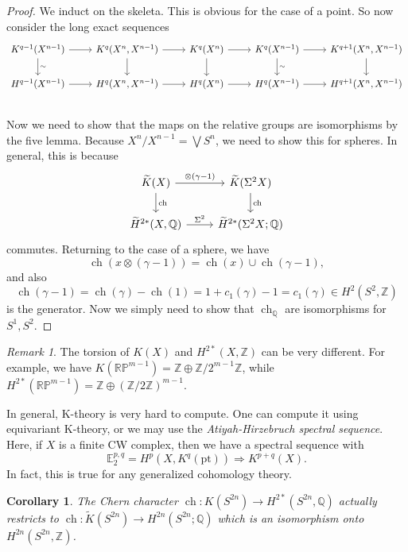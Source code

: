 \documentclass[leqno, openany]{memoir}
\newtheorem{cor}[thm]{Corollary}
\theoremstyle{definition}
\theoremstyle{remark}
\newtheorem{rmk}[thm]{Remark}
\theoremstyle{plain}
\theoremstyle{definition}
\theoremstyle{remark}
\newcommand{\R}{\mathbb{R}}
\newcommand{\E}{\mathbb{E}}
\newcommand{\Z}{\mathbb{Z}}
\newcommand{\Q}{\mathbb{Q}}
\renewcommand{\P}{\mathbb{P}}
\newcommand{\mr}[1]{\mathrm{#1}}
\newcommand{\wt}[1]{\widetilde{#1}}
\DeclareMathOperator{\ch}{ch}
\begin{document}
\begin{proof}
    We induct on the skeleta. This is obvious for the case of a point. So now consider the long exact sequences
    \begin{equation*}
    \begin{tikzcd}
        K^{q-1}(X^{n-1}) \ar{r} \ar{d}{\sim} & K^q(X^n, X^{n-1}) \ar{d} \ar{r} & K^q(X^n) \ar{d} \ar{r} & K^q(X^{n-1}) \ar{d}{\sim}\ar{r} & K^{q+1}(X^n, X^{n-1}) \ar{d} \\
        H^{q-1}(X^{n-1}) \ar{r} & H^q(X^n, X^{n-1}) \ar{r} & H^q(X^n) \ar{r} & H^q(X^{n-1}) \ar{r} & H^{q+1}(X^n, X^{n-1}) \\
    \end{tikzcd}
    \end{equation*}
    Now we need to show that the maps on the relative groups are isomorphisms by the five lemma. Because $X^n/X^{n-1} = \bigvee S^n$, we need to show this for spheres. In general, this is because
    \begin{equation*}
    \begin{tikzcd}
        \wt{K}(X) \ar{r}{\otimes(\gamma-1)} \ar{d}{\ch} & \wt{K}(\Sigma^2 X) \ar{d}{\ch} \\
        \wt{H}^{2*}(X, \Q) \ar{r}{\Sigma^2} & \wt{H}^{2*}(\Sigma^2 X; \Q)
    \end{tikzcd}
    \end{equation*}
    commutes. Returning to the case of a sphere, we have
    \[ \ch(x \otimes (\gamma - 1)) = \ch(x) \cup \ch(\gamma - 1), \]
    and also
    \[ \ch(\gamma - 1) = \ch(\gamma) - \ch(1) = 1 + c_1(\gamma) - 1 = c_1(\gamma) \in H^2(S^2, \Z) \]
    is the generator. Now we simply need to show that $\ch_{\Q}$ are isomorphisms for $S^1, S^2$.
\end{proof}

\begin{rmk}
    The torsion of $K(X)$ and $H^{2*}(X, \Z)$ can be very different. For example, we have $K(\R\P^{m-1}) = \Z \oplus \Z/2^{m-1}\Z$, while $H^{2*}(\R\P^{m-1}) = \Z \oplus {(\Z/2\Z)}^{m-1}$.
\end{rmk}

In general, K-theory is very hard to compute. One can compute it using equivariant K-theory, or we may use the \textit{Atiyah-Hirzebruch spectral sequence}. Here, if $X$ is a finite CW complex, then we have a spectral sequence with
\[ \E_2^{p,q} = H^p(X, K^q(\mr{pt})) \Rightarrow K^{p+q}(X). \]
In fact, this is true for any generalized cohomology theory.

\begin{cor}
    The Chern character $\ch \colon K(S^{2n}) \to H^{2*}(S^{2n}, \Q)$ actually restricts to $\ch \colon \wt{K}(S^{2n}) \to H^{2n}(S^{2n}; \Q)$ which is an isomorphism onto $H^{2n}(S^{2n}, \Z)$.
\end{cor}
\end{document}

